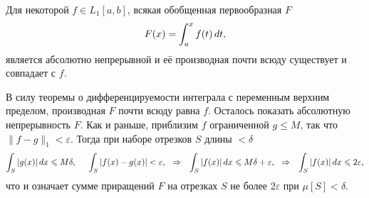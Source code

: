 
\begin{to_thr}[]
    Для некоторой $f \in L_1 [a, b]$, всякая обобщенная первообразная $F$ 
    \begin{equation*}
        F(x) = \int_a^x f(t) \, d t,
    \end{equation*}
     является абсолютно непрерывной и её производная почти всюду существует и совпадает с $f$. 
\end{to_thr}

\begin{uproof}
    В силу теоремы о дифференцируемости интеграла с переменным верхним пределом, производная $F$ почти всюду равна $f$. Осталось показать абсолютную непрерывность $F$. Как и раньше, приблизим $f$ ограниченной $g \leq M$, так что $\|f-g\|_1 < \varepsilon$. Тогда при наборе отрезков $S$ длины $< \delta$
     \begin{equation*}
         \int_S |g(x)| \, d x \leqslant M \delta, \hspace{5 mm} 
         \int_S |f(x) - g(x)| < \varepsilon,
         \hspace{0.25cm} \Rightarrow \hspace{0.25cm}
        \int_S |f(x)| \, d x \leqslant M \delta  + \varepsilon,
        \hspace{0.25cm} \Rightarrow \hspace{0.25cm}
        \int_S |f(x)| \, d x \leqslant 2 \varepsilon,
     \end{equation*}
     что и означает сумме приращений $F$ на отрезках $S$ не более $2\varepsilon$ при $\mu[S] < \delta$. 
\end{uproof}
